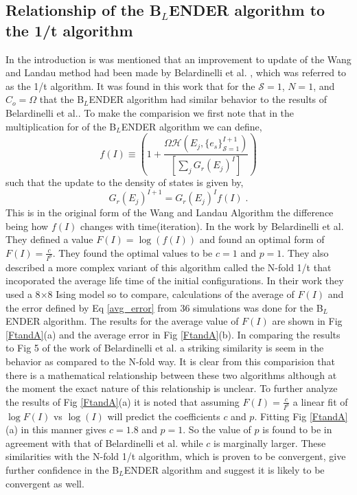 \documentclass[aps,prl,reprint,superscriptaddress,showkeys]{revtex4-1}
\begin{document}
\subsection{Relationship of the B$_L$ENDER algorithm to the 1/t algorithm}
In the introduction is was mentioned that an improvement to update of the Wang and Landau method had been made by Belardinelli et al. \cite{saturation}, which was referred to as the 1/t algorithm. It was found in this work that for the $\mathcal{S}=1$, $N=1$, and $C_{o}=\Omega$ that the B$_L$ENDER algorithm had similar behavior to the results of Belardinelli et al.. To make the comparision we first note that in the multiplication for of the B$_L$ENDER algorithm we can define, 
\begin{equation}
f(I) \equiv ( 1 +  \frac{\Omega \mathcal{H}(E_j,\{e_s\}_{\mathcal{S}=1}^{I+1}) }{ [\sum_j G_{r}(E_j)^{I}] } )  
\label{fequiv}
\end{equation}
such that the update to the density of states is given by,
\begin{equation}
G_{r}(E_j)^{I+1} = G_{r}(E_j)^{I}f(I)\;.
\label{orignialform}
\end{equation}
This is in the original form of the Wang and Landau Algorithm the difference being how $f(I)$ changes with time(iteration). In the work by Belardinelli et al. They defined a value $F(I) = \log(f(I))$  and found an optimal form of $F(I) = \frac{c}{I^p}$. They found the optimal values to be $c=1$ and $p=1$. They also described a more complex variant of this algorithm called the N-fold 1/t  that incoporated the average life time of the initial configurations. In their work they used a 8$\times$8 Ising model so to compare, calculations of the average of $F(I)$ and the error defined by Eq \ref{avg_error} from 36 simulations was done for the B$_L$ENDER algorithm. The results for the average value of $F(I)$ are shown in Fig \ref{FtandA}(a) and the average error in Fig \ref{FtandA}(b). In comparing the results to Fig 5 of the work of Belardinelli et al. \cite{saturation} a striking similarity is seem in the behavior as compared to the N-fold way. It is clear from this comparision that there is a mathematical relationship between these two algorithms although at the moment the exact nature of this relationship is unclear.  To further analyze the results of  Fig \ref{FtandA}(a) it is noted that assuming $F(I) = \frac{c}{I^p}$  a linear fit of  $\log F(I)$ vs $\log(I)$ will predict the coefficients $c$ and $p$. Fitting Fig \ref{FtandA}(a) in this manner gives $c=1.8$ and $p=1$. So the value of $p$ is found to be in agreement with that of Belardinelli et al. while $c$ is marginally larger. These similarities with the N-fold 1/t algorithm, which is proven to be convergent, give further confidence in the B$_L$ENDER algorithm and suggest it is likely to be convergent as well. 
\end{document}
